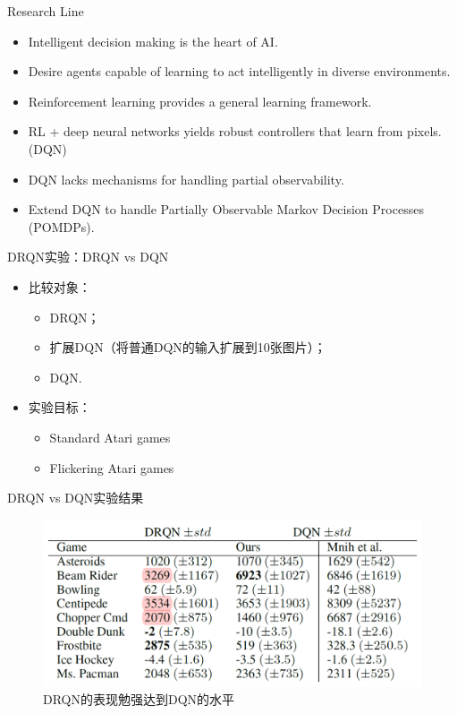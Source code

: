 \documentclass[10pt]{beamer}
\begin{document}
	\begin{frame}{Research Line}
		\begin{itemize}
			\item Intelligent decision making is the heart of AI.
			
			\item Desire agents capable of learning to act intelligently in diverse environments.
			
			\item Reinforcement learning provides a general learning framework.
			
			\item RL + deep neural networks yields robust controllers that learn from pixels. (DQN)
			
			\item DQN lacks mechanisms for handling partial observability.
			
			\item Extend DQN to handle Partially Observable Markov Decision Processes (POMDPs).
			
		\end{itemize}
	\end{frame}

	\begin{frame}{DRQN}{实验：DRQN vs DQN}
		\begin{itemize}
			\item 比较对象：
				\begin{itemize}
					\item DRQN；
					\item 扩展DQN（将普通DQN的输入扩展到10张图片）；
					\item DQN.
				\end{itemize}
			
			\item 实验目标：
				\begin{itemize}
					\item Standard Atari games
					\item Flickering Atari games
				\end{itemize}
			
		\end{itemize}
	\end{frame}

	\begin{frame}{DRQN vs DQN}{实验结果}
		\begin{figure}
			\centering
			\includegraphics[width=0.9\linewidth]{pictures/dqn-vs-drqn-result}
			\caption{DRQN的表现勉强达到DQN的水平}
			\label{fig:dqn-vs-drqn-result}
		\end{figure}
		
	\end{frame}
\end{document}
